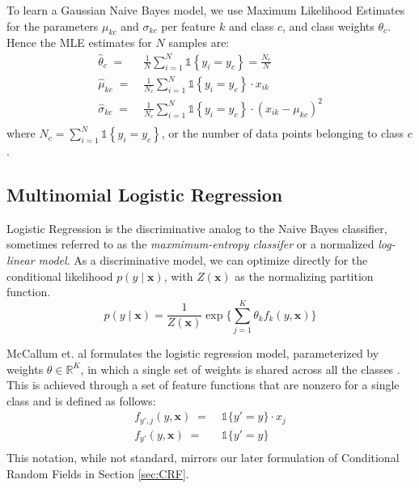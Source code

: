 \documentclass{article}
\begin{document}
To learn a Gaussian Naive Bayes model, we use Maximum Likelihood Estimates for
the parameters $\mu_{kc}$ and $\sigma_{kc}$ per feature $k$ and class $c$, and class weights
$\theta_c$. Hence the MLE estimates for $N$ samples are:
\begin{equation}
  \begin{aligned}
    \hat{\theta}_c \; = \; & \frac{1}{N} \sum_{i=1}^N \mathds{1} \left \{ y_i = y_c \right \} = \frac{N_c}{N} \\
    \hat{\mu}_{kc} \; = \; & \frac{1}{N_c} \sum_{i=1}^N \mathds{1} \left \{ y_i = y_c \right \} \cdot x_{ik} \\
    \hat{\sigma}_{kc} \; = \; & \frac{1}{N_c} \sum_{i=1}^N \mathds{1} \left \{ y_i = y_c \right \} \cdot \left( x_{ik} - \mu_{kc} \right)^2 \\
  \end{aligned}
\end{equation}
where $N_c = \sum_{i=1}^N \mathds{1} \left \{ y_i = y_c \right \} $, or the number
of data points belonging to class $c$ \cite{murphy}.
\subsection{Multinomial Logistic Regression}
\label{sec:LR}
Logistic Regression is the discriminative analog to the Naive Bayes
classifier, sometimes referred to as the \textit{maxmimum-entropy classifer}
or a normalized \textit{log-linear model}. As a discriminative model,
we can optimize directly for the conditional likelihood $p(y \mid \mathbf{x})$,
with $Z(\mathbf{x})$ as the normalizing partition function.
\begin{equation}
  p(y \mid \mathbf{x}) = \frac{1}{Z(\mathbf{x})} \exp \Bigg\{ \sum_{j=1}^K \theta_k f_k\left( y, \mathbf{x} \right) \Bigg\}
\end{equation}

McCallum et. al formulates the logistic regression model, parameterized by
weights $\theta \in \mathbb{R}^K$, in which a single set of weights is shared
across all the classes \cite{McCallumCRF}. This is achieved through a set of
feature functions that are nonzero for a single class and is defined as follows:
\begin{equation}
  \begin{aligned}
    f_{y', j} \left( y, \mathbf{x} \right) \; = \; & \mathds{1} \{ y' = y \} \cdot x_j \\
    f_{y'} \left(y, \mathbf{x}\right) \; = \; & \mathds{1} \{ y' = y \} \\
  \end{aligned}
\end{equation}
This notation, while not standard, mirrors our later formulation of Conditional
Random Fields in Section \ref{sec:CRF}.
\end{document}
